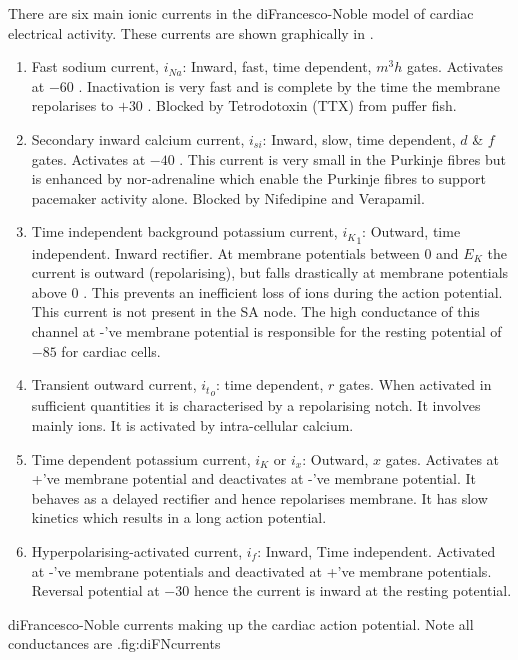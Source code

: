 There are six main ionic currents in the diFrancesco-Noble model of cardiac
electrical activity. These currents are shown graphically in
.
\begin{enumerate}
\item Fast sodium current, $i_{Na}$: Inward, fast, time dependent, $m^{3}h$
  gates.  Activates at $-60$ \mV. Inactivation is very fast and is complete by
  the time the membrane repolarises to $+30$ \mV. Blocked by Tetrodotoxin (TTX)
  from puffer fish.
\item Secondary inward calcium current, $i_{si}$: Inward, slow, time
  dependent, $d$ \& $f$ gates. Activates at $-40$ \mV. This current is very
  small in the Purkinje fibres but is enhanced by nor-adrenaline which enable
  the Purkinje fibres to support pacemaker activity alone. Blocked by
  Nifedipine and Verapamil.
\item Time independent background potassium current, ${i_{K}}_{1}$: Outward,
  time independent. Inward rectifier. At membrane potentials
  between $0$ and $E_{K}$ the current is outward (repolarising), but
  falls drastically at membrane potentials above $0$ \mV. This prevents an
  inefficient loss of  ions during the action potential. This
  current is not present in the SA node. The high conductance of this channel
  at -'ve membrane potential is responsible for the resting potential of 
  $-85$ \mV for cardiac cells.
\item Transient outward current, ${i_{t}}_{o}$: time dependent, $r$ gates.
  When activated in sufficient quantities it is characterised by a
  repolarising notch. It involves mainly  ions. It is activated by
  intra-cellular calcium.
\item Time dependent potassium current, $i_{K}$ or $i_{x}$: Outward, $x$
  gates. Activates at +'ve membrane potential and deactivates at -'ve
  membrane potential. It behaves as a delayed rectifier and hence repolarises
  membrane. It has slow kinetics which results in a long action potential.
\item Hyperpolarising-activated current, $i_{f}$: Inward, Time
  independent. Activated at -'ve membrane potentials and deactivated at +'ve
  membrane potentials. Reversal potential at $-30$ \mV hence the current is
  inward at the resting potential.
\end{enumerate}

{diFrancesco-Noble currents making up the cardiac action potential. Note all
  conductances are .}{fig:diFNcurrents}{}

